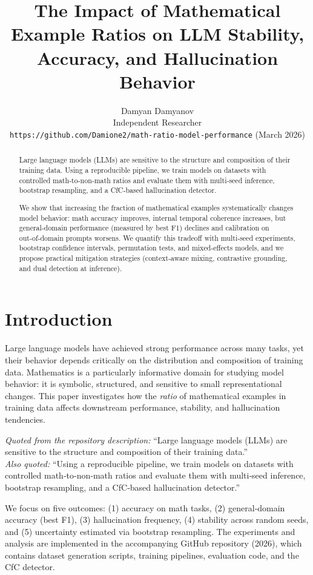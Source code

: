 \documentclass[11pt,a4paper]{article}
\title{The Impact of Mathematical Example Ratios on LLM Stability, Accuracy, and Hallucination Behavior}
\author{Damyan Damyanov\\Independent Researcher\\\texttt{https://github.com/Damione2/math-ratio-model-performance} (March 2026)}
\date{}
\begin{document}
\maketitle

\begin{abstract}
Large language models (LLMs) are sensitive to the structure and composition of their training data. Using a reproducible pipeline, we train models on datasets with controlled math‑to‑non‑math ratios and evaluate them with multi‑seed inference, bootstrap resampling, and a CfC‑based hallucination detector.

We show that increasing the fraction of mathematical examples systematically changes model behavior: math accuracy improves, internal temporal coherence increases, but general‑domain performance (measured by best F1) declines and calibration on out‑of‑domain prompts worsens. We quantify this tradeoff with multi‑seed experiments, bootstrap confidence intervals, permutation tests, and mixed‑effects models, and we propose practical mitigation strategies (context‑aware mixing, contrastive grounding, and dual detection at inference).
\end{abstract}

\section{Introduction}
Large language models have achieved strong performance across many tasks, yet their behavior depends critically on the distribution and composition of training data. Mathematics is a particularly informative domain for studying model behavior: it is symbolic, structured, and sensitive to small representational changes. This paper investigates how the \emph{ratio} of mathematical examples in training data affects downstream performance, stability, and hallucination tendencies.

\emph{Quoted from the repository description:} ``Large language models (LLMs) are sensitive to the structure and composition of their training data.'' \\
\emph{Also quoted:} ``Using a reproducible pipeline, we train models on datasets with controlled math‑to‑non‑math ratios and evaluate them with multi‑seed inference, bootstrap resampling, and a CfC‑based hallucination detector.''

We focus on five outcomes: (1) accuracy on math tasks, (2) general‑domain accuracy (best F1), (3) hallucination frequency, (4) stability across random seeds, and (5) uncertainty estimated via bootstrap resampling. The experiments and analysis are implemented in the accompanying GitHub repository (2026), which contains dataset generation scripts, training pipelines, evaluation code, and the CfC detector.
\end{document}
